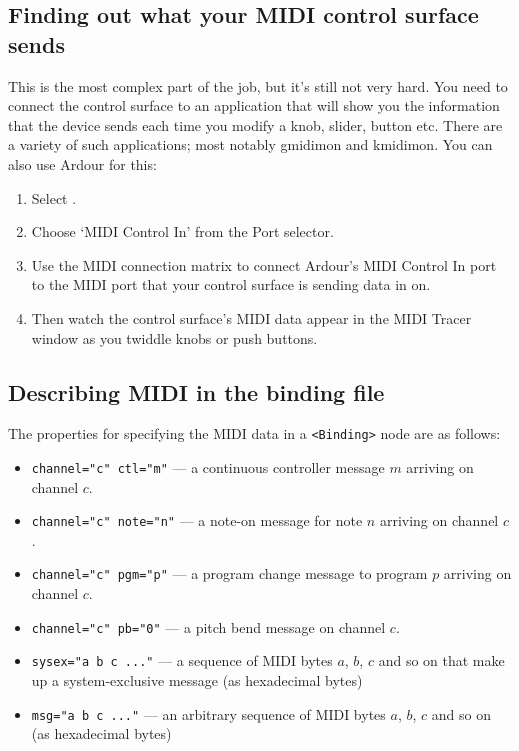 \documentclass[10pt,a4paper]{book}
\newcommand{\menu}[1]{\emph{\StrSubstitute{#1}{,}{ $\rightarrow$ }}}
\begin{document}
\subsection{Finding out what your MIDI control surface sends}

This is the most complex part of the job, but it's still not very hard.
You need to connect the control surface to an application that will
show you the information that the device sends each time you modify a
knob, slider, button etc.  There are a variety of such applications;
most notably gmidimon and kmidimon.  You can also use Ardour for this:

\begin{enumerate}
\item Select \menu{Window,MIDI Tracer}.
\item Choose `MIDI Control In' from the Port selector.
\item Use the MIDI connection matrix to connect Ardour's
MIDI Control In port to the MIDI port that your control surface is
sending data in on.
\item Then watch the control surface's MIDI data appear
in the MIDI Tracer window as you twiddle knobs or push buttons.
\end{enumerate}


\subsection{Describing MIDI in the binding file}

The properties for specifying the MIDI data in a \texttt{<Binding>}
node are as follows:

\begin{itemize}
\item \texttt{channel="c" ctl="m"} --- a continuous controller message $m$ arriving on channel $c$.
\item \texttt{channel="c" note="n"} --- a note-on message for note $n$ arriving on channel $c$.
\item \texttt{channel="c" pgm="p"} --- a program change message to program $p$ arriving on channel $c$.
\item \texttt{channel="c" pb="0"} --- a pitch bend message on channel $c$.
\item \texttt{sysex="a b c ..."} --- a sequence of MIDI bytes $a$, $b$, $c$ and so on that make up a system-exclusive message (as hexadecimal bytes)
\item \texttt{msg="a b c ..."} --- an arbitrary sequence of MIDI bytes $a$, $b$, $c$ and so on (as hexadecimal bytes)
\end{itemize}
\end{document}
